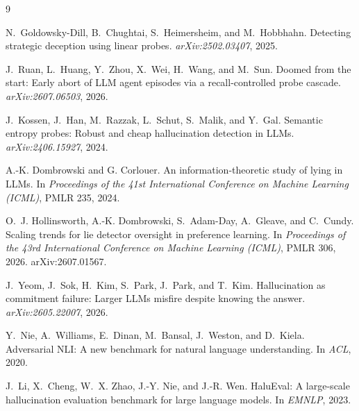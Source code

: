 \documentclass[10pt, letterpaper]{article}
\begin{document}
\begin{thebibliography}{9}\footnotesize

N.~Goldowsky-Dill, B.~Chughtai, S.~Heimersheim, and M.~Hobbhahn.
\newblock Detecting strategic deception using linear probes.
\newblock \emph{arXiv:2502.03407}, 2025.

J.~Ruan, L.~Huang, Y.~Zhou, X.~Wei, H.~Wang, and M.~Sun.
\newblock Doomed from the start: Early abort of LLM agent episodes via a
  recall-controlled probe cascade.
\newblock \emph{arXiv:2607.06503}, 2026.

J.~Kossen, J.~Han, M.~Razzak, L.~Schut, S.~Malik, and Y.~Gal.
\newblock Semantic entropy probes: Robust and cheap hallucination detection in
  LLMs.
\newblock \emph{arXiv:2406.15927}, 2024.

A.-K. Dombrowski and G. Corlouer.
\newblock An information-theoretic study of lying in LLMs.
\newblock In \emph{Proceedings of the 41st International Conference on Machine
  Learning (ICML)}, PMLR 235, 2024.

O.~J. Hollinsworth, A.-K. Dombrowski, S.~Adam-Day, A.~Gleave, and C.~Cundy.
\newblock Scaling trends for lie detector oversight in preference learning.
\newblock In \emph{Proceedings of the 43rd International Conference on Machine
  Learning (ICML)}, PMLR 306, 2026. arXiv:2607.01567.

J.~Yeom, J.~Sok, H.~Kim, S.~Park, J.~Park, and T.~Kim.
\newblock Hallucination as commitment failure: Larger LLMs misfire despite
  knowing the answer.
\newblock \emph{arXiv:2605.22007}, 2026.

Y.~Nie, A.~Williams, E.~Dinan, M.~Bansal, J.~Weston, and D.~Kiela.
\newblock Adversarial NLI: A new benchmark for natural language understanding.
\newblock In \emph{ACL}, 2020.

J.~Li, X.~Cheng, W.~X. Zhao, J.-Y. Nie, and J.-R. Wen.
\newblock HaluEval: A large-scale hallucination evaluation benchmark for large
  language models.
\newblock In \emph{EMNLP}, 2023.

\end{thebibliography}
\end{document}
